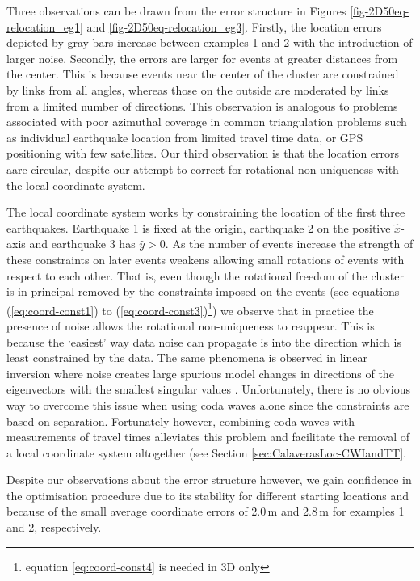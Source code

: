 \documentclass[extra, onecolumn, doublespacing]{gji}
\begin{document}
Three observations can be drawn from the error structure in Figures
\ref{fig-2D50eq-relocation_eg1} and \ref{fig-2D50eq-relocation_eg3}.
Firstly, the location errors depicted by gray bars increase between
examples 1 and 2 with the introduction of larger noise. Secondly,
the errors are larger for events at greater distances from the
center. This is because events near the center of the cluster are
constrained by links from all angles, whereas those on the outside
are moderated by links from a limited number of directions. This
observation is analogous to problems associated with poor azimuthal
coverage in common triangulation problems such as individual
earthquake location from limited travel time data, or GPS
positioning with few satellites. Our third observation is that the
location errors aare circular, despite our attempt to correct for
rotational non-uniqueness with the local coordinate system.

The local coordinate system works by constraining the location of
the first three earthquakes. Earthquake 1 is fixed at the origin,
earthquake 2 on the positive $\hat{x}$-axis and earthquake 3 has
$\hat{y}>0$. As the number of events increase the strength of these
constraints on later events weakens allowing small rotations of
events with respect to each other. That is, even though the
rotational freedom of the cluster is in principal removed by the
constraints imposed on the events (see equations
(\ref{eq:coord-const1}) to (\ref{eq:coord-const3})\footnote{equation
\ref{eq:coord-const4} is needed in 3D only}) we observe that in
practice the presence of noise allows the rotational non-uniqueness
to reappear. This is because the `easiest' way data noise can
propagate is into the direction which is least constrained by the
data. The same phenomena is observed in linear inversion where noise
creates large spurious model changes in directions of the
eigenvectors with the smallest singular values \citep{dr_Aster05a}.
Unfortunately, there is no obvious way to overcome this issue when
using coda waves alone since the constraints are based on
separation. Fortunately however, combining coda waves with
measurements of travel times alleviates this problem and facilitate
the removal of a local coordinate system altogether (see Section
\ref{sec:CalaverasLoc-CWIandTT}.

Despite our observations about the error structure however, we gain
confidence in the optimisation procedure due to its stability for
different starting locations and because of the small average
coordinate errors of 2.0\,m and 2.8\,m for examples 1 and 2,
respectively.
\end{document}
